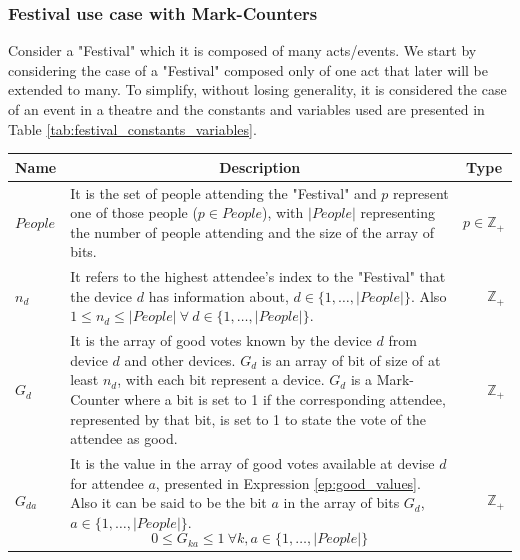 \subsubsection{Festival use case with Mark-Counters} 
Consider a "Festival" which it is composed of many acts/events. We start by considering the case of a "Festival" composed only of one act that later will be extended to many. To simplify, without losing generality, it is considered the case of an event in a theatre and the constants and variables used are presented in Table \ref{tab:festival_constants_variables}.
\begin{table}[!ht]
	\begin{tabular}{|p{2.4cm}|p{11.2cm}|r| }
		\hline
		\multicolumn{1}{|c|}{Name} & \multicolumn{1}{c|}{Description} & \multicolumn{1}{c|}{Type} \\
		\hline
		\hline
			$People$ & It is the set of people attending the "Festival" and $p$ represent one of those people ($p \in People$), with $|People|$ representing the number of people attending and the size of the array of bits. & $p \in \mathbb{Z}_{+}$ \\
		\hline
			$n_{d}$ & It refers to the highest attendee's index to the "Festival" that the device $d$ has information about,  $d \in \{1,\dots, |People|\}$. Also $1 \le n_{d} \le |People| ~ \forall ~ d \in \{1,\dots, |People|\}$. & $\mathbb{Z}_{+}$ \\
		\hline
			$G_{d}$ & It is the array of good votes known by the device $d$ from device $d$ and other devices. $G_{d}$ is an array of bit of size of at least $n_{d}$, with each bit represent a device. $G_{d}$ is a Mark-Counter where a bit is set to 1 if the corresponding attendee, represented by that bit, is set to 1 to state the vote of the attendee as good. & $\mathbb{Z}_{+}$ \\
		\hline 
			$G_{da}$ & It is the value in the array of good votes available at devise $d$ for attendee $a$, presented in Expression \ref{ep:good_values}. Also it can be said to be the bit $a$ in the array of bits $G_{d}$, $a \in \{1,\dots, |People|\}$.
				\begin{equation} \label{ep:good_values}
					0 \le G_{ka} \le 1 ~ \forall k,a \in \{1,\dots, |People|\}
				\end{equation} & 
			$\mathbb{Z}_{+}$ \\

\end{tabular}
\end{table}
